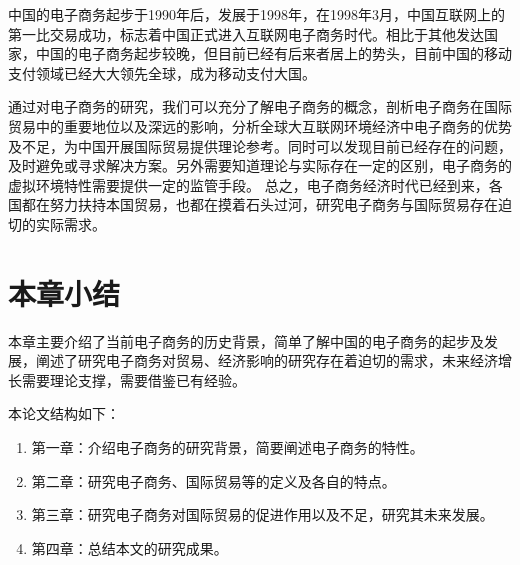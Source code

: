 中国的电子商务起步于1990年后，发展于1998年，在1998年3月，中国互联网上的第一比交易成功，标志着中国正式进入互联网电子商务时代。相比于其他发达国家，中国的电子商务起步较晚，但目前已经有后来者居上的势头，目前中国的移动支付领域已经大大领先全球，成为移动支付大国。

通过对电子商务的研究，我们可以充分了解电子商务的概念，剖析电子商务在国际贸易中的重要地位以及深远的影响，分析全球大互联网环境经济中电子商务的优势及不足，为中国开展国际贸易提供理论参考。同时可以发现目前已经存在的问题，及时避免或寻求解决方案。另外需要知道理论与实际存在一定的区别，电子商务的虚拟环境特性需要提供一定的监管手段。
总之，电子商务经济时代已经到来，各国都在努力扶持本国贸易，也都在摸着石头过河，研究电子商务与国际贸易存在迫切的实际需求。

\section{本章小结}
本章主要介绍了当前电子商务的历史背景，简单了解中国的电子商务的起步及发展，阐述了研究电子商务对贸易、经济影响的研究存在着迫切的需求，未来经济增长需要理论支撑，需要借鉴已有经验。

本论文结构如下：
\begin{enumerate}[(1)]
\setlength{\itemsep}{0ex}
\item 第一章：介绍电子商务的研究背景，简要阐述电子商务的特性。
\item 第二章：研究电子商务、国际贸易等的定义及各自的特点。
\item 第三章：研究电子商务对国际贸易的促进作用以及不足，研究其未来发展。
\item 第四章：总结本文的研究成果。
\end{enumerate}